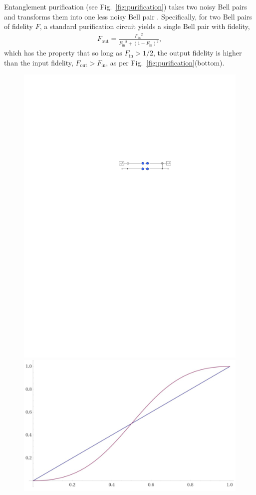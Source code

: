 Entanglement purification (see Fig.~\ref{fig:purification}) takes two noisy Bell pairs and transforms them into one less noisy Bell pair \cite{bib:Bennett96}. Specifically, for two Bell pairs of fidelity $F$, a standard purification circuit \cite{pan???} yields a single Bell pair with fidelity,
\begin{align}
F_\mathrm{out} = \frac{{F_\mathrm{in}}^2}{{F_\mathrm{in}}^2 + (1 - {F_\mathrm{in}})^2},
\end{align}
which has the property that so long as \mbox{$F_\mathrm{in}>1/2$}, the output fidelity is higher than the input fidelity, \mbox{$F_\mathrm{out}>F_\mathrm{in}$}, as per Fig.~\ref{fig:purification}(bottom).

\begin{figure}[!htb]
	\centering
	\includegraphics[width=\columnwidth]{figures/Entanglement_purification.pdf}\\
	\includegraphics[width=\columnwidth]{figures/Purification_fidelity.pdf}

\end{figure}
